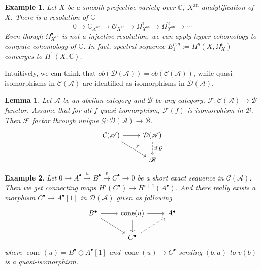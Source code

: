 \documentclass{ctexart}
\newtheorem{lemma}{Lemma}[section]
\newtheorem{example}{Example}[section]
\newcommand{\cone}{\operatorname{cone}}
\newcommand{\analytification}{\operatorname{an}}
\begin{document}
\begin{example}
    Let $X$ be a smooth projective variety over $\mathbb{C}$, $X^{\analytification}$ analytification of $X$.
    There is a resolution of $\mathbb{C}$
    \begin{equation}
        0 \rightarrow \mathbb{C}_{X^{\analytification}} \rightarrow \mathcal{O}_{X^{\analytification}} \rightarrow \Omega_{X^{\analytification}}^{1} \rightarrow \Omega_{X^{\analytification}}^{2} \rightarrow \cdots
    \end{equation}
    Even though $\Omega_{X^{\analytification}}^{\bullet}$ is not a injective resolution,
    we can apply hyper cohomology to compute cohomology of $\mathbb{C}$.
    In fact, spectral sequence $E_{1}^{p, q} := H^{q}(X, \Omega_{X}^{p})$ converges to $H^{1}(X, \mathbb{C})$.
    \label{example:compute_cohomology_of_complex_field_with_hyper_cohomology}
\end{example}
Intuitively, we can think that $ob(\mathcal{D}(\mathscr{A})) = ob(\mathcal{C}(\mathscr{A}))$,
while quasi-isomorphisms in $\mathcal{C}(\mathscr{A})$ are identified as isomorphisms in $\mathcal{D}(\mathscr{A})$.
\begin{lemma}
    Let $\mathscr{A}$ be an abelian category and $\mathscr{B}$ be any category, $\mathcal{F}: \mathcal{C}(\mathscr{A}) \rightarrow \mathscr{B}$ functor.
    Assume that for all $f$ quasi-isomorphism, $\mathcal{F}(f)$ is isomorphism in $\mathscr{B}$.
    Then $\mathcal{F}$ factor through unique $\mathcal{G}: \mathcal{D}(\mathscr{A}) \rightarrow \mathscr{B}$.
    \begin{equation}
        \begin{tikzcd}
            \mathcal{C}(\mathscr{A}) \arrow[r] \arrow[dr, "\mathcal{F}"] &
            \mathcal{D}(\mathscr{A}) \arrow[d, dashrightarrow, "\exists! \mathcal{G}"] \\
            & \mathscr{B}
        \end{tikzcd}
    \end{equation}
    \label{Lemma 6.1}
\end{lemma}
\begin{example}
    Let $0 \rightarrow A^{\bullet} \overset{u}{\rightarrow} B^{\bullet} \overset{v}{\rightarrow} C^{\bullet} \rightarrow 0$ be a short exact sequence in $\mathcal{C}(\mathscr{A})$.
    Then we get connecting maps $H^{i}(C^{\bullet}) \rightarrow H^{i + 1}(A^{\bullet})$.
    And there really exists a morphism $C^{\bullet} \rightarrow A^{\bullet}[1]$ in $\mathcal{D}(\mathscr{A})$ given as following
    \begin{equation}
        \begin{tikzcd}
            B^{\bullet} \arrow[r] \arrow[dr] &
            \cone(u) \arrow[r] \arrow[d] & 
            A^{\bullet} \\
            & C^{\bullet} \arrow[ur, dashrightarrow] &
        \end{tikzcd}
    \end{equation}
    where $\cone(u) = B^{\bullet} \oplus A^{\bullet}[1]$ and $\cone(u) \rightarrow C^{\bullet}$ sending $(b, a)$ to $v(b)$ is a quasi-isomorphism.
    \label{example:short_exact_sequence_of_complexes_inducing_a_triangle}
\end{example}
\end{document}
